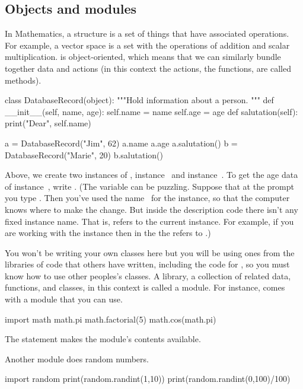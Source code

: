 \subsection{Objects and modules}
In Mathematics, a structure is a set of things that have associated operations.
For example, a vector space is a set with the operations
of addition and scalar multiplication.
\python{} is object-oriented, which means that we can similarly bundle
together data and actions (in this context the actions, the functions, 
are called methods).
\begin{pythonconsole}
class DatabaseRecord(object):
    """Hold information about a person.
    """
    def __init__(self, name, age):
        self.name = name
        self.age = age
    def salutation(self):
        print("Dear", self.name)

a = DatabaseRecord("Jim", 62)
a.name
a.age
a.salutation()
b = DatabaseRecord("Marie", 20)
b.salutation()
\end{pythonconsole}
Above, we create two instances of 
, instance~ and
instance~.
To get the age data of instance~, write 
.
(The \protect{} variable 
can be puzzling.
Suppose that at the prompt you type .
Then you've used the name~ 
for the instance, so that the computer knows where to
make the change.
But
inside the  description code there isn't any fixed instance name.
That is,  refers to the current instance. 
For example, if you are working with the instance  then 
in the  the  refers
to .)

You won't be writing your own classes here 
but you will be using ones from
the libraries of code that others have written, including the
code for \Sage, so you must know how to use 
other peoples's classes.
A library, a collection of related data, functions, and classes, in this context
is called a module.
For instance, \python{} comes with a  module that you can use.
\begin{pythonconsole}
import math
math.pi
math.factorial(5)
math.cos(math.pi)
\end{pythonconsole}
The  statement makes the module's
contents available.

Another module does random numbers.
\begin{pythonconsole}
import random
print(random.randint(1,10))
print(random.randint(0,100)/100)
\end{pythonconsole}



